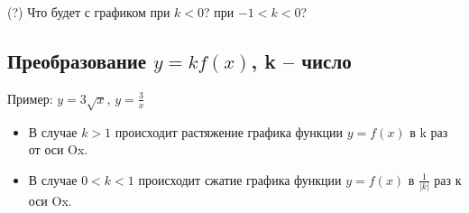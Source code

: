 (?) Что будет с графиком при $k<0$? при $-1<k<0$?

\subsection{Преобразование $y = k f (x)$, k   – число}

Пример: $y=3\sqrt{x}$, $y=\frac{3}{x}$

\begin{itemize}
    \item В случае   $k > 1$   происходит растяжение графика функции
    $y = f (x)$ в k раз от оси Ox.
    \item В случае   $0 < k < 1$   происходит сжатие графика функции
    $y = f (x)$ в $\frac{1}{|k|}$ раз к оси Ox.
\end{itemize}

\newpage

